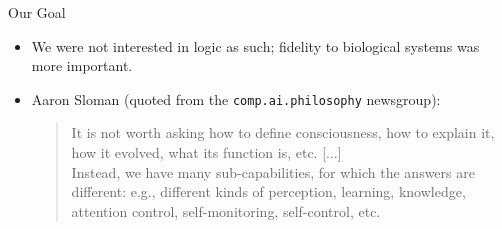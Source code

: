 \documentclass{beamer}
\begin{document}
   \begin{frame}{Our Goal}
      \begin{itemize}
         \item We were not interested in logic as such; fidelity to biological systems was more important.
         
         \medskip
         
         \item Aaron Sloman (quoted from the \texttt{comp.ai.philosophy} newsgroup):
         
         \begin{quote}
            It is not worth asking how to define consciousness, how to explain it, how it
            evolved, what its function is, etc. [...]\\
            Instead, we have many sub-capabilities, for which the answers are different: e.g., different kinds of perception, learning, knowledge, attention control, self-monitoring, self-control, etc.
         \end{quote}
         
      \end{itemize}
   \end{frame}
   
%         
%
   
\end{document}
